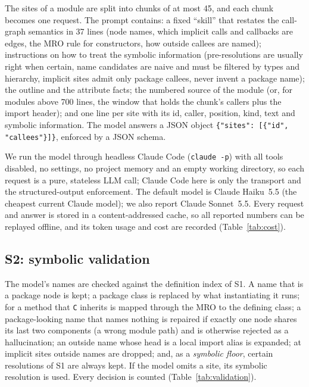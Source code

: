 The sites of a module are split into chunks of at most 45, and each chunk
becomes one request. The prompt contains: a fixed ``skill'' that restates the
call-graph semantics in 37 lines (node names, which implicit calls and
callbacks are edges, the MRO rule for constructors, how outside callees are
named); instructions on how to treat the symbolic information (pre-resolutions
are usually right when certain, name candidates are naive and must be filtered
by types and hierarchy, implicit sites admit only package callees, never invent
a package name); the outline and the attribute facts; the numbered source of
the module (or, for modules above 700 lines, the window that holds the chunk's
callers plus the import header); and one line per site with its id, caller,
position, kind, text and symbolic information. The model answers a JSON object
\texttt{\{"sites": [\{"id", "callees"\}]\}}, enforced by a JSON schema.

We run the model through headless Claude Code (\texttt{claude -p}) with all
tools disabled, no settings, no project memory and an empty working directory,
so each request is a pure, stateless LLM call; Claude Code here is only the
transport and the structured-output enforcement. The default model is Claude
Haiku~5.5 (the cheapest current Claude model); we also report Claude
Sonnet~5.5. Every request and answer is stored in a content-addressed cache,
so all reported numbers can be replayed offline, and its token usage
and cost are recorded (Table~\ref{tab:cost}).

\subsection{S2: symbolic validation}
\label{sec:s2}

The model's names are checked against the definition index of S1. A name that
is a package node is kept; a package class is replaced by what instantiating it
runs;  for a method that \texttt{C} inherits is mapped through
the MRO to the defining class; a package-looking name that names nothing is
repaired if exactly one node shares its last two components (a wrong module
path) and is otherwise rejected as a hallucination; an outside name whose head
is a local import alias is expanded; at implicit sites outside names are
dropped; and, as a \emph{symbolic floor}, certain resolutions of S1 are always
kept. If the model omits a site, its symbolic resolution is used. Every
decision is counted (Table~\ref{tab:validation}).

